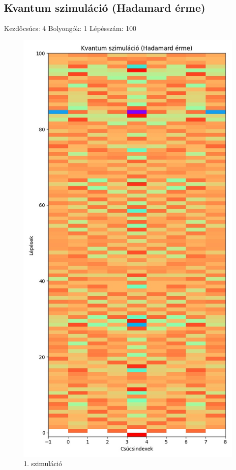 \documentclass[14pt,a4paper]{article}
\begin{document}
\subsection{Kvantum szimuláció (Hadamard érme)}
Kezdőcsúcs: 4
Bolyongók: 1
Lépésszám: 100
\begin{figure}[H]
\centering
\includegraphics[width = 0.7\columnwidth]{sim_01/counts.jpg}
\caption{1. szimuláció}
\end{figure}
\end{document}
